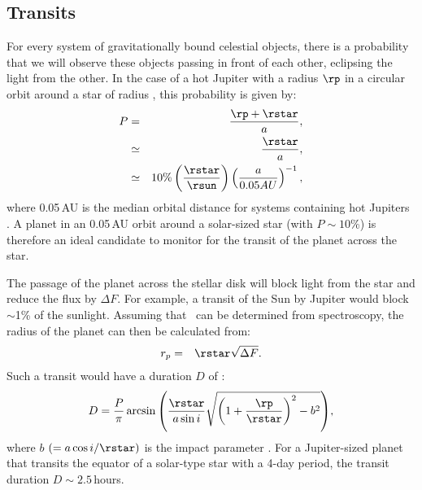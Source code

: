 \subsection{Transits}
\label{cha:intro:sec:methods:sub:trans}

For every system of gravitationally bound celestial objects, there is a probability that we will observe these objects passing in front of each other, eclipsing the light from the other.
In the case of a hot Jupiter with a radius $\rp$ in a circular orbit around a star of radius \rstar, this probability is given by:
\begin{eqnarray*}
P & = & \frac{\rp + \rstar}{a},\\
 & \simeq & \frac{\rstar}{a},\\
  & \simeq & 10\% \left( \frac{\rstar}{\rsun} \right) \left( \frac{a}{0.05 AU} \right)^{-1}, 
\end{eqnarray*}
where 0.05\,AU is the median orbital distance for systems containing hot Jupiters \citep{Sackett:POSS:1999a}.
A planet in an 0.05\,AU orbit around a solar-sized star (with $P\sim10$\%) is therefore an ideal candidate to monitor for the transit of the planet across the star. 

The passage of the planet across the stellar disk will block light from the star and reduce the flux by $\Delta F$.
For example, a transit of the Sun by Jupiter would block $\sim$1\% of the sunlight. 
Assuming that \rstar\ can be determined from spectroscopy, the radius of the planet can then be calculated from:
\begin{eqnarray*}
r_{p} & = & {\rstar} \sqrt{\Delta F}.
\end{eqnarray*}
Such a transit would have a duration $D$ of :
\begin{eqnarray*}
D = \frac{P}{\pi} \arcsin{\left( \frac{\rstar}{a \sin{i}} 
\sqrt{\left(1+\frac{\rp}{\rstar}\right)^2 - b^2} \right)},
\end{eqnarray*}
where $b$ $(=a\cos{i}/\rstar)$ is the impact parameter \citep{Seager_Mallen-Ornelas:apj:2003a}. 
For a Jupiter-sized planet that transits the equator of a solar-type star with a 4-day period, the transit duration $D\sim2.5$\,hours.

